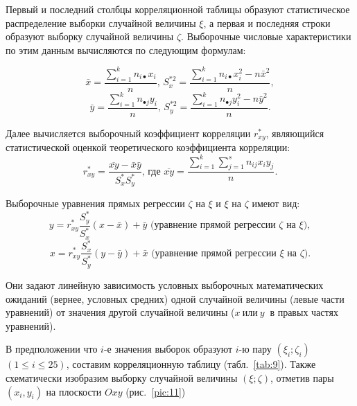 Первый и последний столбцы корреляционной таблицы образуют статистическое распределение выборки случайной величины $ \xi $, а первая и последняя строки образуют выборку случайной величины $ \zeta $. Выборочные числовые характеристики по этим данным вычисляются по следующим формулам:

$$  
	\bar{x} = \frac{\sum\limits_{i=1}^k {n_{i \bullet} x_i}}{n} \text{, } 
	S_x^{*2} = \frac{\sum\limits_{i=1}^k {n_{i \bullet} x_i^2 - n \bar{x}^2}}{n}{, } 
$$
$$  
	\bar{y} = \frac{\sum\limits_{i=1}^k {n_{\bullet j} y_i}}{n} \text{, } 
	S_y^{*2} = \frac{\sum\limits_{i=1}^k {n_{\bullet j} y_i^2 - n \bar{y}^2}}{n}{.} 
$$

Далее вычисляется выборочный коэффициент корреляции  $ r^{*}_{xy} $, являющийся статистической оценкой теоретического коэффициента корреляции:
$$  
	r^{*}_{xy}  = \frac{\overline{xy} - \bar{x}\bar{y}}{S^*_x S^*_y} \text{, где } 
	\overline{xy} = \frac{\sum\limits_{i=1}^k{\sum\limits_{j=1}^s {n_{ij} x_i y_j}}}{n}{. } 
$$

Выборочные уравнения прямых регрессии $ \zeta $ на $ \xi $ и $ \xi $ на $ \zeta $ имеют вид:
$$  
	y = r^{*}_{xy} \frac{S^*_y}{S_x^*}(x - \bar{x}) + \bar{y} \text{  (уравнение прямой регрессии~}  \zeta \text{ на } \xi){,}
$$
$$  
	x= r^{*}_{xy} \frac{S^*_x}{S_y^*}(y - \bar{y}) + \bar{x}  \text{  (уравнение прямой регрессии~} \xi \text{ на } \zeta ){.}
$$

Они задают линейную зависимость условных выборочных математических ожиданий (вернее, условных средних) одной случайной величины (левые части уравнений) от значения другой случайной величины ($ x\ \text{или}\ y\ $ в правых частях уравнений).

В предположении что $ i $-е значения выборок образуют $ i $-ю пару  $ (\xi_i;\zeta_i) $ $ (1 \leqslant i \leqslant 25) $, составим корреляционную таблицу (табл.~\ref{tab:9}). Также схематически изобразим выборку 
случайной величины $(\xi;\zeta)$, отметив пары $(x_i, y_i)$ на плоскости $Oxy$ (рис.~\ref{pic:11})





  

  

  

  

  

  

  

  

  

  

